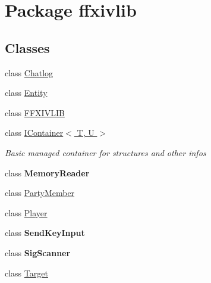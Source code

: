 \hypertarget{namespaceffxivlib}{\section{Package ffxivlib}
\label{namespaceffxivlib}
}
\subsection*{Classes}
\begin{DoxyCompactItemize}
\item 
class \hyperlink{classffxivlib_1_1_chatlog}{Chatlog}
\item 
class \hyperlink{classffxivlib_1_1_entity}{Entity}
\item 
class \hyperlink{classffxivlib_1_1_f_f_x_i_v_l_i_b}{F\-F\-X\-I\-V\-L\-I\-B}
\item 
class \hyperlink{classffxivlib_1_1_i_container_3_01_t_00_01_u_01_4}{I\-Container$<$ T, U $>$}
\begin{DoxyCompactList}\small\item\em Basic managed container for structures and other infos \end{DoxyCompactList}\item 
class {\bfseries Memory\-Reader}
\item 
class \hyperlink{classffxivlib_1_1_party_member}{Party\-Member}
\item 
class \hyperlink{classffxivlib_1_1_player}{Player}
\item 
class {\bfseries Send\-Key\-Input}
\item 
class {\bfseries Sig\-Scanner}
\item 
class \hyperlink{classffxivlib_1_1_target}{Target}
\end{DoxyCompactItemize}
